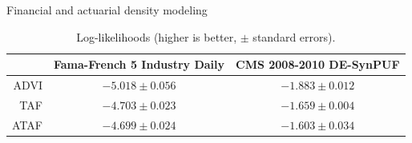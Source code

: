 \begin{frame}{Financial \parencite{fama2015five} and actuarial \parencite{cms} density modeling}
    \begin{table}[htbp]
    \centering
    \begin{tabular}{rcc}
        \toprule
                  & Fama-French 5 Industry Daily & CMS 2008-2010 DE-SynPUF       \\
        \midrule
        ADVI      & $-5.018 \pm 0.056$    & $-1.883 \pm 0.012$ \\
        TAF       & $-4.703 \pm 0.023$    & $-1.659 \pm 0.004$ \\
        ATAF      & $\mathbf{-4.699} \pm 0.024$    & $\mathbf{-1.603} \pm 0.034$ \\\bottomrule
    \end{tabular}
    \vspace{-2mm}
    \caption{
        Log-likelihoods (higher is better, $\pm$ standard errors).
    }
    \label{tab:density-estimation}
\end{table}
\end{frame}


